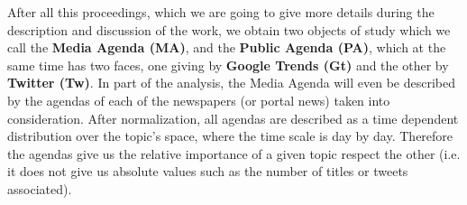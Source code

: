 \par After all this proceedings, which we are going to give more details during the description and discussion of the work, we obtain two objects of study which we call the \textbf{Media Agenda (MA)}, and the \textbf{Public Agenda (PA)}, which at the same time has two faces, one giving by \textbf{Google Trends (Gt)} and the other by \textbf{Twitter (Tw)}. 
In part of the analysis, the Media Agenda will even be described by the agendas of each of the newspapers (or portal news) taken into consideration. 
After normalization, all agendas are described as a time dependent distribution over the topic's space, where the time scale is day by day.
Therefore the agendas give us the relative importance of a given topic respect the other (i.e. it does not give us absolute values such as the number of titles or tweets associated).


